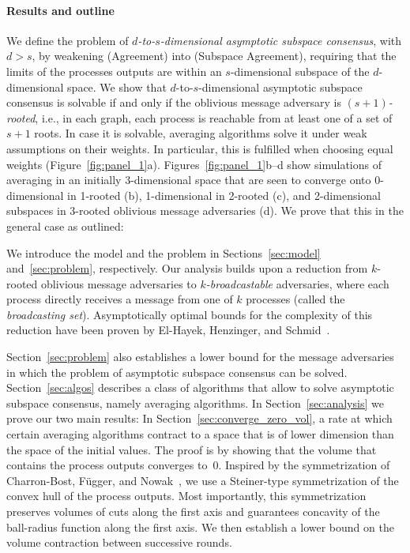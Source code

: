 \documentclass[a4paper,USenglish]{lipics-v2021}
\begin{document}
\paragraph*{Results and outline}

We define the problem of \emph{$d$-to-$s$-dimensional asymptotic subspace consensus}, with $d > s$, by weakening
(Agreement) into (Subspace Agreement), requiring that the limits of the processes outputs are within an $s$-dimensional subspace
of the $d$-dimensional space.
We show that $d$-to-$s$-dimensional asymptotic subspace consensus is solvable if and only if the oblivious message adversary is \emph{$(s+1)$-rooted}, i.e., in each graph, each process is reachable from at least one of a set of $s+1$ roots.
In case it is solvable, averaging algorithms solve it under weak assumptions on their weights.
In particular, this is fulfilled when choosing equal weights (Figure~\ref{fig:panel_1}a).
Figures~\ref{fig:panel_1}b--d show simulations of averaging in an initially 3-dimensional space that are seen to converge onto 0-dimensional in 1-rooted (b), 1-dimensional in 2-rooted (c), and 2-dimensional subspaces in 3-rooted oblivious message adversaries (d).
We prove that this in the general case as outlined:

We introduce the model and the problem in Sections~\ref{sec:model} and~\ref{sec:problem}, respectively.
Our analysis builds upon a reduction from $k$-rooted oblivious message adversaries to \emph{$k$-broadcastable} adversaries, where each process directly receives a message from one of $k$ processes (called the \emph{broadcasting set}).
Asymptotically optimal bounds for the complexity of this reduction have been proven by El-Hayek, Henzinger, and Schmid~\cite{el2023asymptotically}.

Section~\ref{sec:problem} also establishes a lower bound for the message adversaries in which the problem of asymptotic subspace consensus can be solved.
Section~\ref{sec:algos} describes a class of algorithms that allow to solve asymptotic subspace consensus, namely averaging algorithms.
In Section~\ref{sec:analysis} we prove our two main results:
In Section~\ref{sec:converge_zero_vol}, a rate at which certain averaging algorithms contract to a space that is of lower dimension than the space of the initial values.
The proof is by showing that the volume that contains the process outputs converges to~0.
Inspired by the symmetrization of Charron-Bost, Függer, and Nowak~\cite{CBFN16:centroid}, we use a Steiner-type symmetrization of the convex hull of the process outputs.
Most importantly, this symmetrization preserves volumes of cuts along the first axis and guarantees concavity of the ball-radius function along the first axis.
We then establish a lower bound on the volume contraction between successive rounds.
\end{document}
